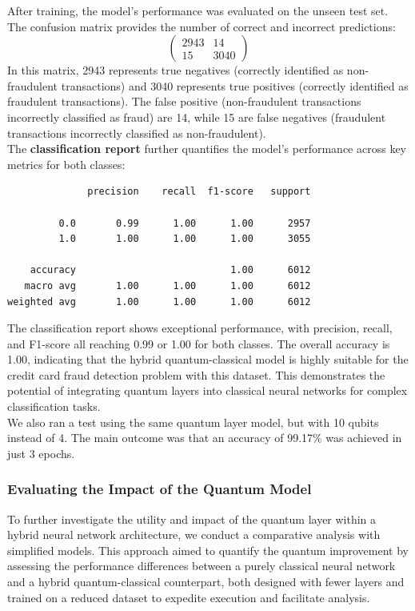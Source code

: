 \documentclass[10pt]{article}
\begin{document}
\noindent After training, the model's performance was evaluated on the unseen test set. The confusion matrix provides the number of correct and incorrect predictions:
\[
\begin{pmatrix}
    2943 & 14 \\
    15 & 3040
\end{pmatrix}
\]
In this matrix, 2943 represents true negatives (correctly identified as non-fraudulent transactions) and 3040 represents true positives (correctly identified as fraudulent transactions). The false positive (non-fraudulent transactions incorrectly classified as fraud) are 14, while 15 are false negatives (fraudulent transactions incorrectly classified as non-fraudulent).\\
The \textbf{classification report} further quantifies the model's performance across key metrics for both classes:
\begin{verbatim}
              precision    recall  f1-score   support

         0.0       0.99      1.00      1.00      2957
         1.0       1.00      1.00      1.00      3055

    accuracy                           1.00      6012
   macro avg       1.00      1.00      1.00      6012
weighted avg       1.00      1.00      1.00      6012
\end{verbatim}
The classification report shows exceptional performance, with precision, recall, and F1-score all reaching 0.99 or 1.00 for both classes. The overall accuracy is 1.00, indicating that the hybrid quantum-classical model is highly suitable for the credit card fraud detection problem with this dataset. This demonstrates the potential of integrating quantum layers into classical neural networks for complex classification tasks.\\
We also ran a test using the same quantum layer model, but with 10 qubits instead of 4. The main outcome was that an accuracy of 99.17\% was achieved in just 3 epochs.


\subsubsection{Evaluating the Impact of the Quantum Model}
To further investigate the utility and impact of the quantum layer within a hybrid neural network architecture, we conduct a comparative analysis with simplified models. This approach aimed to quantify the quantum improvement by assessing the performance differences between a purely classical neural network and a hybrid quantum-classical counterpart, both designed with fewer layers and trained on a reduced dataset to expedite execution and facilitate analysis.\\
\end{document}
